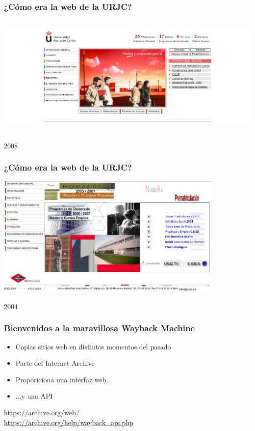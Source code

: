 \begin{frame}
\frametitle{¿Cómo era la web de la URJC?}

\includegraphics[height=6cm]{figs/web-urjc-2008}

{\Large
\begin{flushright}
2008
\end{flushright}
}
\end{frame}

\begin{frame}
\frametitle{¿Cómo era la web de la URJC?}

\includegraphics[height=6cm]{figs/web-urjc-2004}

{\Large
\begin{flushright}
2004
\end{flushright}
}
\end{frame}

\begin{frame}
\frametitle{Bienvenidos a la maravillosa Wayback Machine}

{\Large
\begin{itemize}
\item Copias sitios web en distintos momentos del pasado
\item Parte del Internet Archive
\item Proporiciona una interfaz web...
\item ...y una API
\end{itemize}

\begin{flushright}
\url{https://archive.org/web/} \\
\url{https://archive.org/help/wayback_api.php} \\
\end{flushright}
}


\end{frame}


